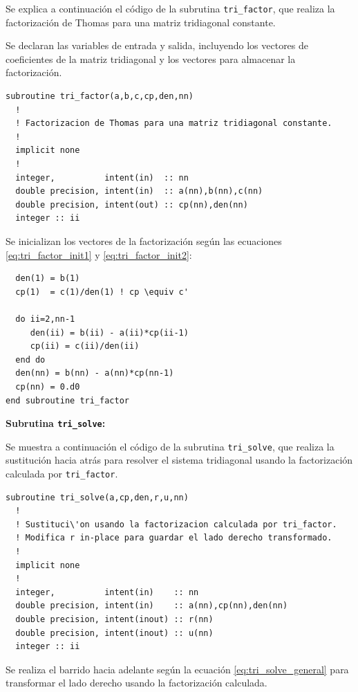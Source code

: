 \documentclass[11pt,a4paper]{article}
\begin{document}
\medskip

Se explica a continuaci\'on el c\'odigo de la subrutina \verb|tri_factor|, 
que realiza la factorizaci\'on de Thomas para una matriz tridiagonal 
constante.

\medskip

Se declaran las variables de entrada y salida, incluyendo los vectores de 
coeficientes de la matriz tridiagonal y los vectores para almacenar la 
factorizaci\'on.

\begin{verbatim}
subroutine tri_factor(a,b,c,cp,den,nn)
  !
  ! Factorizacion de Thomas para una matriz tridiagonal constante.
  !
  implicit none
  !
  integer,          intent(in)  :: nn
  double precision, intent(in)  :: a(nn),b(nn),c(nn)
  double precision, intent(out) :: cp(nn),den(nn)
  integer :: ii
\end{verbatim}

Se inicializan los vectores de la factorización seg\'un las ecuaciones 
\ref{eq:tri_factor_init1} y \ref{eq:tri_factor_init2}:

\begin{verbatim}
  den(1) = b(1)
  cp(1)  = c(1)/den(1) ! cp \equiv c'

  do ii=2,nn-1
     den(ii) = b(ii) - a(ii)*cp(ii-1)
     cp(ii) = c(ii)/den(ii)
  end do
  den(nn) = b(nn) - a(nn)*cp(nn-1)
  cp(nn) = 0.d0
end subroutine tri_factor
\end{verbatim}

\textbf{Subrutina \texttt{tri\_solve}:}

\medskip

Se muestra a continuaci\'on el c\'odigo de la subrutina \verb|tri_solve|, que
realiza la sustituci\'on hacia atr\'as para resolver el sistema tridiagonal
usando la factorizaci\'on calculada por \verb|tri_factor|.

\begin{verbatim}
subroutine tri_solve(a,cp,den,r,u,nn)
  !
  ! Sustituci\'on usando la factorizacion calculada por tri_factor.
  ! Modifica r in-place para guardar el lado derecho transformado.
  !
  implicit none
  !
  integer,          intent(in)    :: nn
  double precision, intent(in)    :: a(nn),cp(nn),den(nn)
  double precision, intent(inout) :: r(nn)
  double precision, intent(inout) :: u(nn)
  integer :: ii
\end{verbatim}

Se realiza el barrido hacia adelante seg\'un la ecuaci\'on 
\ref{eq:tri_solve_general} para transformar el lado derecho usando la
factorizaci\'on calculada.
\end{document}
